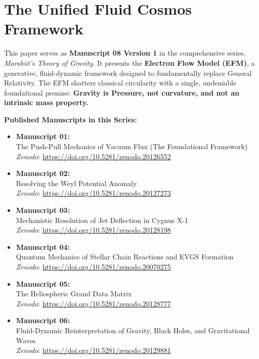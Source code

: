\documentclass[11pt, a4paper]{article}
\begin{document}
\section*{The Unified Fluid Cosmos Framework}
  This paper serves as \textbf{Manuscript 08 Version 1} in the comprehensive series, \textit{Marab\={u}t's Theory of Gravity}. It presents the \textbf{Electron Flow Model (EFM)}, a generative, fluid-dynamic framework designed to fundamentally replace General Relativity. The EFM shatters classical circularity with a single, undeniable foundational premise: \textbf{Gravity is Pressure, not curvature, and not an intrinsic mass property.}

  \vspace{1em}
  \noindent \textbf{Published Manuscripts in this Series:}
  \begin{itemize}
    \item \textbf{Manuscript 01:} \\ The Push-Pull Mechanics of Vacuum Flux (The Foundational Framework) \\ \textit{Zenodo}: \url{https://doi.org/10.5281/zenodo.20126552}
    
    \item \textbf{Manuscript 02:} \\ Resolving the Weyl Potential Anomaly \\ \textit{Zenodo}: \url{https://doi.org/10.5281/zenodo.20127273}

    \item \textbf{Manuscript 03:} \\ Mechanistic Resolution of Jet Deflection in Cygnus X-1 \\ \textit{Zenodo}: \url{https://doi.org/10.5281/zenodo.20128198}

    \item \textbf{Manuscript 04:} \\ Quantum Mechanics of Stellar Chain Reactions and EVGS Formation \\ \textit{Zenodo}: \url{https://doi.org/10.5281/zenodo.20070275}

    \item \textbf{Manuscript 05:} \\ The Heliospheric Grand Data Matrix \\ \textit{Zenodo}: \url{https://doi.org/10.5281/zenodo.20128777}

    \item \textbf{Manuscript 06:} \\ Fluid-Dynamic Reinterpretation of Gravity, Black Holes, and Gravitational Waves \\ \textit{Zenodo}: \url{https://doi.org/10.5281/zenodo.20129881}


\end{itemize}
\end{document}
